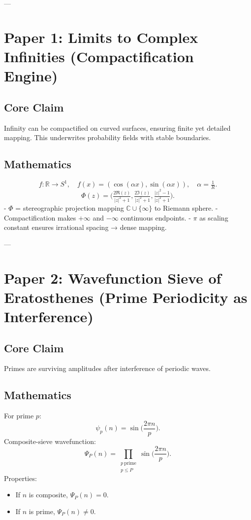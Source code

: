 \documentclass[12pt]{article}
\begin{document}
---

\section{Paper 1: Limits to Complex Infinities (Compactification Engine)}
\subsection{Core Claim}
Infinity can be compactified on curved surfaces, ensuring finite yet detailed mapping. This underwrites probability fields with stable boundaries.  

\subsection{Mathematics}
\[
f: \mathbb{R} \to S^1, \quad f(x)=(\cos(\alpha x),\sin(\alpha x)), \quad \alpha = \tfrac{1}{R}.
\]
\[
\Phi(z) = \Big( \tfrac{2\Re(z)}{|z|^2+1}, \tfrac{2\Im(z)}{|z|^2+1}, \tfrac{|z|^2-1}{|z|^2+1} \Big).
\]
- $\Phi$ = stereographic projection mapping $\mathbb{C}\cup\{\infty\}$ to Riemann sphere.  
- Compactification makes $+\infty$ and $-\infty$ continuous endpoints.  
- $\pi$ as scaling constant ensures irrational spacing → dense mapping.  

---

\section{Paper 2: Wavefunction Sieve of Eratosthenes (Prime Periodicity as Interference)}
\subsection{Core Claim}
Primes are surviving amplitudes after interference of periodic waves.  

\subsection{Mathematics}
For prime $p$:
\[
\psi_p(n) = \sin\!\Big(\frac{2\pi n}{p}\Big).
\]
Composite-sieve wavefunction:
\[
\Psi_P(n) = \prod_{\substack{p\ \text{prime}\\p \leq P}} \sin\!\Big(\frac{2\pi n}{p}\Big).
\]
Properties:
\begin{itemize}
\item If $n$ is composite, $\Psi_P(n)=0$.  
\item If $n$ is prime, $\Psi_P(n)\neq 0$.  
\end{itemize}
\end{document}
